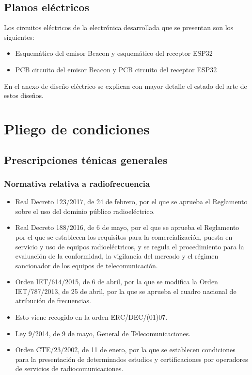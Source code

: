 \documentclass[paper=a4, fontsize=11pt,twoside]{scrartcl}	%
\begin{document}
    \subsection{Planos eléctricos}
        Los circuitos eléctricos de la electrónica desarrollada que se presentan son los siguientes:
        \begin{itemize}
            \item Esquemático del emisor Beacon y esquemático del receptor ESP32
            \item PCB circuito del emisor Beacon y PCB circuito del receptor ESP32
        \end{itemize}
        En el anexo de diseño eléctrico se explican con mayor detalle el estado del arte de estos diseños.
\section{Pliego de condiciones}
    \subsection{Prescripciones ténicas generales}
        \subsubsection{Normativa relativa a radiofrecuencia}
            \begin{itemize}
                \item Real Decreto 123/2017, de 24 de febrero, por el que se aprueba el Reglamento
                sobre el uso del dominio público radioeléctrico.
                \item Real Decreto 188/2016, de 6 de mayo, por el que se aprueba el Reglamento 
                por el que se establecen los requisitos para la comercialización, puesta en servicio 
                y uso de equipos radioeléctricos, y se regula el procedimiento para la evaluación de
                la conformidad, la vigilancia del mercado y el régimen sancionador de los equipos de
                telecomunicación.
                \item Orden IET/614/2015, de 6 de abril, por la que se modifica la Orden IET/787/2013,
                de 25 de abril, por la que se aprueba el cuadro nacional de atribución de frecuencias.
                \item Esto viene recogido en la orden ERC/DEC/(01)07.
                \item Ley 9/2014, de 9 de mayo, General de Telecomunicaciones.
                \item Orden CTE/23/2002, de 11 de enero, por la que se establecen condiciones para la presentación de determinados
                estudios y certificaciones por operadores de servicios de radiocomunicaciones. 
            \end{itemize}
\end{document}
